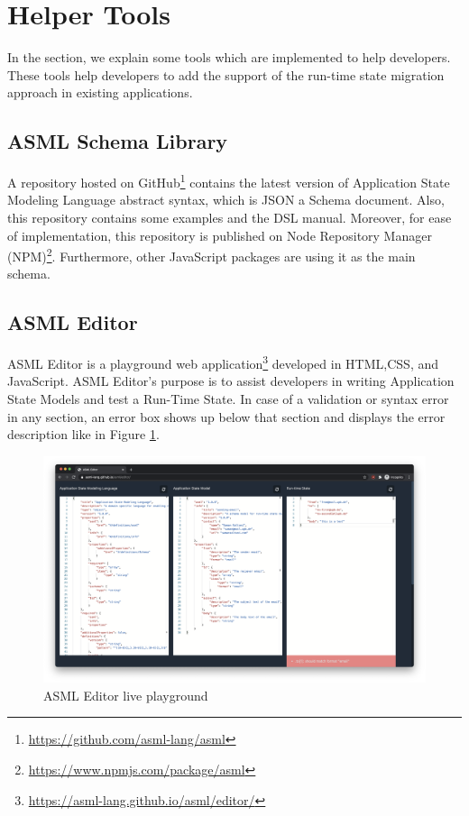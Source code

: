 \section{Helper Tools}
In the section, we explain some tools which are implemented to help developers. These tools help developers to add the support of the run-time state migration approach in existing applications.
\subsection{ASML Schema Library}
A repository hosted on GitHub\footnote{\url{https://github.com/asml-lang/asml}} contains the latest version of Application State Modeling Language abstract syntax, which is JSON a Schema document. Also, this repository contains some examples and the DSL manual. Moreover, for ease of implementation, this repository is published on Node Repository Manager (NPM)\footnote{\url{https://www.npmjs.com/package/asml}}. Furthermore, other JavaScript packages are using it as the main schema.
 

\subsection{ASML Editor}
ASML Editor is a playground web application\footnote{\url{https://asml-lang.github.io/asml/editor/}} developed in HTML,CSS, and JavaScript. ASML Editor's purpose is to assist developers in writing Application State Models and test a Run-Time State. In case of a validation or syntax error in any section, an error box shows up below that section and displays the error description like in Figure \ref{fig:asml-editor}. 
\FloatBarrier \begin{figure}[H]
    \includegraphics[width=\linewidth]{../figures/asml-editor.png}
    \centering
    \caption{ASML Editor live playground}
    \label{fig:asml-editor}
\end{figure} \FloatBarrier

